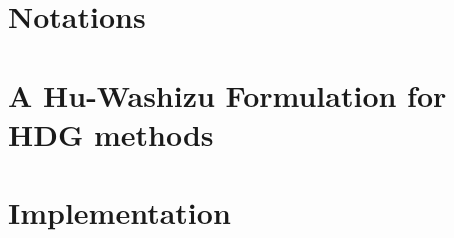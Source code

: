 \documentclass[a4paper, 11pt]{book}
\begin{document}
\appendix

\chapter{Notations}


\chapter{A Hu-Washizu Formulation for HDG methods}


\chapter{Implementation}



%
%
%
%
%
%
%
%

% 


\end{document}
